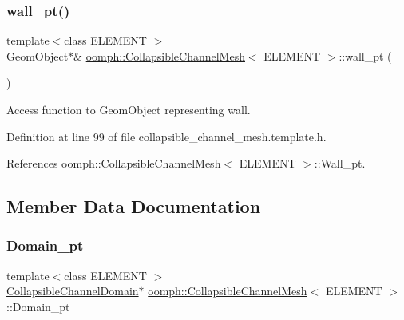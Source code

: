 \mbox{\label{classoomph_1_1CollapsibleChannelMesh_a04ffeb61678763dfd250962ea9ba614b}} 
\subsubsection{\texorpdfstring{wall\+\_\+pt()}{wall\_pt()}}
{\footnotesize\ttfamily template$<$class E\+L\+E\+M\+E\+NT $>$ \\
Geom\+Object$\ast$\& \hyperlink{classoomph_1_1CollapsibleChannelMesh}{oomph\+::\+Collapsible\+Channel\+Mesh}$<$ E\+L\+E\+M\+E\+NT $>$\+::wall\+\_\+pt (\begin{DoxyParamCaption}{ }\end{DoxyParamCaption})\hspace{0.3cm}{\ttfamily [inline]}}



Access function to Geom\+Object representing wall. 



Definition at line 99 of file collapsible\+\_\+channel\+\_\+mesh.\+template.\+h.



References oomph\+::\+Collapsible\+Channel\+Mesh$<$ E\+L\+E\+M\+E\+N\+T $>$\+::\+Wall\+\_\+pt.



\subsection{Member Data Documentation}
\mbox{\label{classoomph_1_1CollapsibleChannelMesh_ae7b9e4a110dded8399a6daf6f48a9e23}} 
\subsubsection{\texorpdfstring{Domain\+\_\+pt}{Domain\_pt}}
{\footnotesize\ttfamily template$<$class E\+L\+E\+M\+E\+NT $>$ \\
\hyperlink{classoomph_1_1CollapsibleChannelDomain}{Collapsible\+Channel\+Domain}$\ast$ \hyperlink{classoomph_1_1CollapsibleChannelMesh}{oomph\+::\+Collapsible\+Channel\+Mesh}$<$ E\+L\+E\+M\+E\+NT $>$\+::Domain\+\_\+pt\hspace{0.3cm}{\ttfamily [protected]}}



